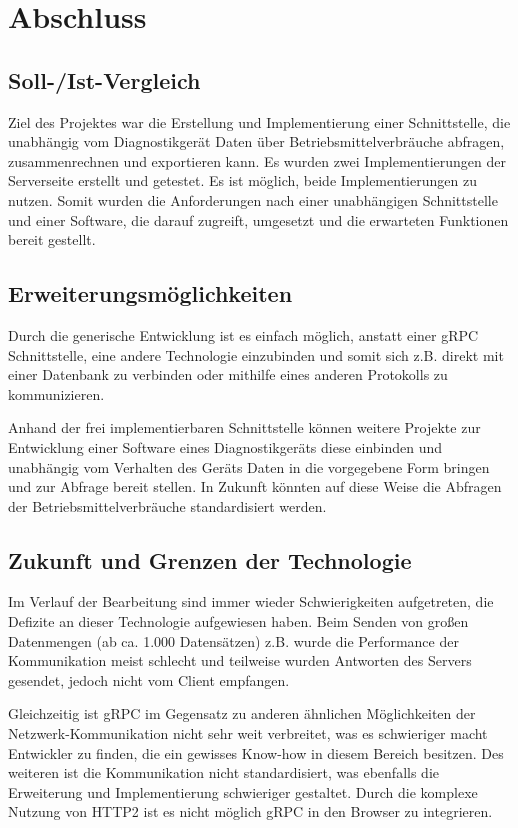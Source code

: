 \section{Abschluss}
\label{sec:Abschluss}

\subsection{Soll-/Ist-Vergleich}
\label{sec:SollIstVergleich}
Ziel des Projektes war die Erstellung und Implementierung einer Schnittstelle, die unabhängig vom Diagnostikgerät Daten über Betriebsmittelverbräuche abfragen, zusammenrechnen und exportieren kann. Es wurden zwei Implementierungen der Serverseite erstellt und getestet. Es ist möglich, beide Implementierungen zu nutzen. Somit wurden die Anforderungen nach einer unabhängigen Schnittstelle und einer Software, die darauf zugreift, umgesetzt und die erwarteten Funktionen bereit gestellt.

\subsection{Erweiterungsmöglichkeiten}
\label{sec:Erweiterungsmoeglichkeiten}
Durch die generische Entwicklung ist es einfach möglich, anstatt einer {\acs{gRPC}} Schnittstelle, eine andere Technologie einzubinden und somit sich z.B. direkt mit einer Datenbank zu verbinden oder mithilfe eines anderen Protokolls zu kommunizieren.

Anhand der frei implementierbaren Schnittstelle können weitere Projekte zur Entwicklung einer Software eines Diagnostikgeräts diese einbinden und unabhängig vom Verhalten des Geräts Daten in die vorgegebene Form bringen und zur Abfrage bereit stellen. In Zukunft könnten auf diese Weise die Abfragen der Betriebsmittelverbräuche standardisiert werden.

\subsection{Zukunft und Grenzen der Technologie}
\label{sec:ZukunftUndGrenzen}
Im Verlauf der Bearbeitung sind immer wieder Schwierigkeiten aufgetreten, die Defizite an dieser Technologie aufgewiesen haben. Beim Senden von großen Datenmengen (ab ca. 1.000 Datensätzen) z.B. wurde die Performance der Kommunikation meist schlecht und teilweise wurden Antworten des Servers gesendet, jedoch nicht vom Client empfangen.

Gleichzeitig ist {\acs{gRPC}} im Gegensatz zu anderen ähnlichen Möglichkeiten der Netzwerk-Kommunikation nicht sehr weit verbreitet, was es schwieriger macht Entwickler zu finden, die ein gewisses Know-how in diesem Bereich besitzen. Des weiteren ist die Kommunikation nicht standardisiert, was ebenfalls die Erweiterung und Implementierung schwieriger gestaltet. Durch die komplexe Nutzung von {\acs{HTTP2}} ist es nicht möglich {\acs{gRPC}} in den Browser zu integrieren.

